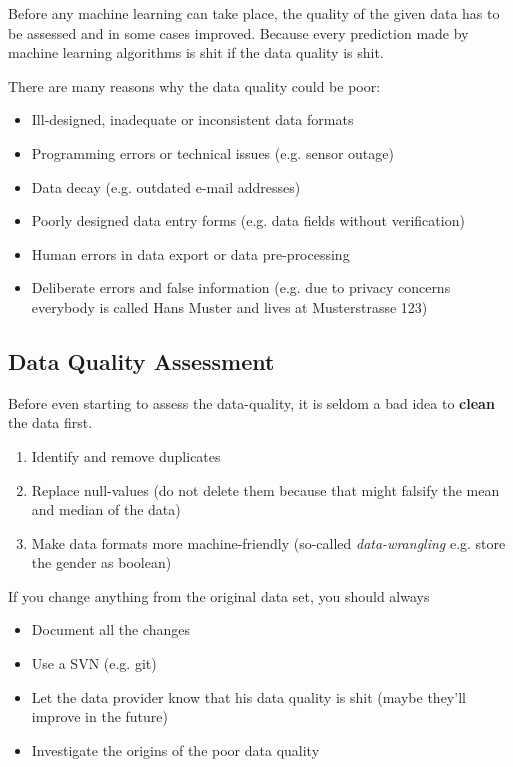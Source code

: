 \documentclass[11pt]{article}
\begin{document}
Before any machine learning can take place, the quality of the given data has to be assessed and in some cases improved. Because every prediction made by machine learning algorithms is shit if the data quality is shit.

There are many reasons why the data quality could be poor:

\begin{itemize}
    \item Ill-designed, inadequate or inconsistent data formats
    \item Programming errors or technical issues (e.g. sensor outage)
    \item Data decay (e.g. outdated e-mail addresses)
    \item Poorly designed data entry forms (e.g. data fields without verification)
    \item Human errors in data export or data pre-processing
    \item Deliberate errors and false information (e.g. due to privacy concerns everybody is called Hans Muster and lives at Musterstrasse 123)
\end{itemize}

\subsection{Data Quality Assessment}

Before even starting to assess the data-quality, it is seldom a bad idea to \textbf{clean} the data first.

\begin{enumerate}
    \item Identify and remove duplicates
    \item Replace null-values (do not delete them because that might falsify the mean and median of the data)
    \item Make data formats more machine-friendly (so-called \textit{data-wrangling} e.g. store the gender as boolean)
\end{enumerate}

\newpage

If you change anything from the original data set, you should always

\begin{itemize}
    \item Document all the changes
    \item Use a SVN (e.g. git)
    \item Let the data provider know that his data quality is shit (maybe they'll improve in the future)
    \item Investigate the origins of the poor data quality
\end{itemize}
\end{document}
